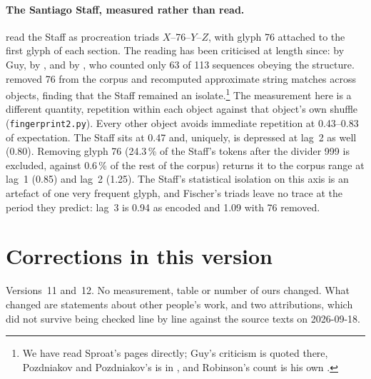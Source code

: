 \documentclass[11pt,a4paper]{article}
\begin{document}
\paragraph{The Santiago Staff, measured rather than read.} \citet{fischer1995} read the Staff as procreation triads $X$--76--$Y$--$Z$, with glyph 76 attached to the first glyph of each section. The reading has been criticised at length since: by Guy, by \citet{pozdniakov2007}, and by \citet{robinson2002}, who counted only 63 of 113 sequences obeying the structure. \citet{sproatror} removed 76 from the corpus and recomputed approximate string matches across objects, finding that the Staff remained an isolate.\footnote{We have read Sproat's pages directly; Guy's criticism is quoted there, Pozdniakov and Pozdniakov's is in \citet{pozdniakov2007}, and Robinson's count is his own \citep{robinson2002}.} The measurement here is a different quantity, repetition within each object against that object's own shuffle (\texttt{fingerprint2.py}). Every other object avoids immediate repetition at 0.43--0.83 of expectation. The Staff sits at 0.47 and, uniquely, is depressed at lag~2 as well (0.80). Removing glyph 76 (24.3\,\% of the Staff's tokens after the divider 999 is excluded, against 0.6\,\% of the rest of the corpus) returns it to the corpus range at lag~1 (0.85) and lag~2 (1.25). The Staff's statistical isolation on this axis is an artefact of one very frequent glyph, and Fischer's triads leave no trace at the period they predict: lag~3 is 0.94 as encoded and 1.09 with 76 removed.


\section*{Corrections in this version}
Versions~11 and~12. No measurement, table or number of ours changed. What changed are
statements about other people's work, and two attributions, which did not survive
being checked line by line against the source texts on 2026-09-18.
\end{document}
